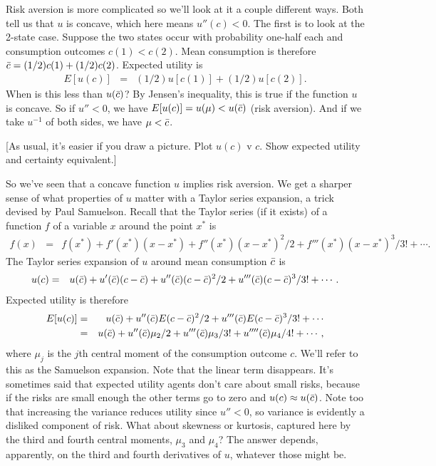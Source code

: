 \documentclass[11pt]{article}
\begin{document}
Risk aversion is more complicated so
we'll look at it a couple different ways.
Both tell us that $u$ is concave,
which here means  $u''(c) < 0$.
The first is to look at the 2-state case.
Suppose the two states occur with probability one-half each
and consumption outcomes $c(1) < c(2)$.
Mean consumption is therefore $ \bar{c} = (1/2)c(1) + (1/2) c(2)$.
Expected utility is
\begin{eqnarray*}
    E [u(c)] &=&  (1/2) u[c(1)] + (1/2) u[c(2)] .
\end{eqnarray*}
When is this less than $u(\bar{c})$?
By Jensen's inequality, this is true if the function $u$ is concave.
So if $u'' < 0$, we have $E[u(c)] = u(\mu) < u(\bar{c})$ (risk aversion).
And if we take $u^{-1}$ of both sides, we have
$\mu < \bar{c}$.

[As usual, it's easier if you draw a picture.
Plot $u(c)$ v $c$.
Show expected utility and certainty equivalent.]

So we've seen that a concave function $u$ implies risk aversion.
We get a sharper sense of what properties of $u$ matter with
a Taylor series expansion, a trick devised by Paul Samuelson.
Recall that the Taylor series (if it exists) of a
function $f$ of a variable $x$ around the point $x^*$ is
\begin{eqnarray*}
    f(x) &=& f(x^*) + f'(x^*) (x-x^*) + f''(x^*) (x-x^*)^2/2 +
        f'''(x^*) (x-x^*)^3/3! + \cdots .
\end{eqnarray*}
The Taylor series expansion of $u$ around mean consumption $\bar{c}$
is
\begin{eqnarray*}
    u(c) &=& u(\bar{c}) + u'(\bar{c}) (c-\bar{c})  + u''(\bar{c}) (c-\bar{c})^2/2
        + u'''(\bar{c}) (c-\bar{c})^3/3! + \cdots .
\end{eqnarray*}
Expected utility is therefore
\begin{eqnarray}
  E [u(c)] &=& u(\bar{c}) + u''(\bar{c}) E (c-\bar{c})^2/2
        + u'''(\bar{c}) E (c-\bar{c})^3/3! + \cdots \nonumber \\
        &=& u(\bar{c}) + u''(\bar{c}) \mu_2/2
            + u'''(\bar{c}) \mu_3 /3! + u''''(\bar{c}) \mu_4 /4! + \cdots ,
        \label{eq:eu-samuelson}
\end{eqnarray}
where $\mu_j$ is the $j$th central moment of the consumption outcome $c$.
We'll refer to this as the Samuelson expansion.
Note that the linear term disappears.
It's sometimes said that expected utility agents
don't care about small risks, because if the risks are small enough
the other terms go to zero and $u(c) \approx u(\bar{c})$.
Note too that increasing the variance reduces
utility since $u'' < 0$,
so variance is evidently a disliked component of risk.
What about skewness or kurtosis, captured here by the third
and fourth central moments, $\mu_3$ and $\mu_4$?
The answer depends, apparently,
on the third and fourth derivatives of $u$,
whatever those might be.
\end{document}

